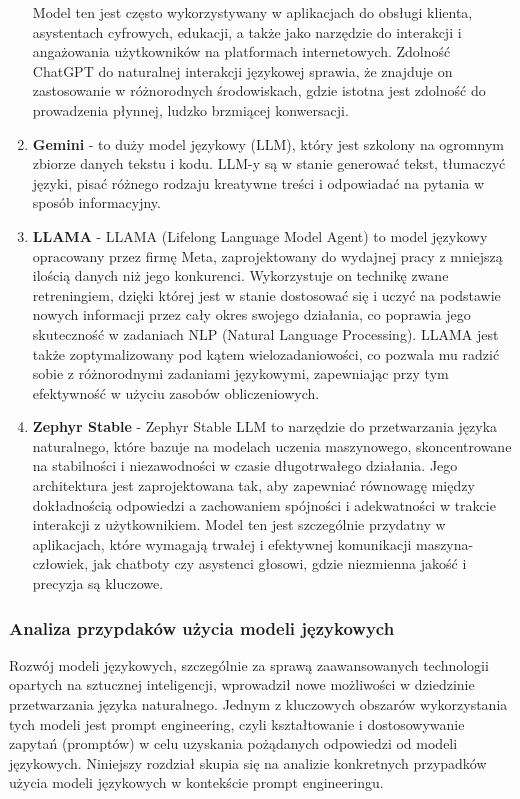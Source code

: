 \begin{enumerate}
    Model ten jest często wykorzystywany w aplikacjach do obsługi klienta, asystentach cyfrowych, edukacji, a także jako narzędzie do interakcji i angażowania użytkowników na platformach internetowych. Zdolność ChatGPT do naturalnej interakcji językowej sprawia, że znajduje on zastosowanie w różnorodnych środowiskach, gdzie istotna jest zdolność do prowadzenia płynnej, ludzko brzmiącej konwersacji.
    \\
    \item {\bf Gemini} - to duży model językowy (LLM), który jest szkolony na ogromnym zbiorze danych tekstu i kodu. LLM-y są w stanie generować tekst, tłumaczyć języki, pisać różnego rodzaju kreatywne treści i odpowiadać na pytania w sposób informacyjny.
    \\
    \item {\bf LLAMA} - LLAMA (Lifelong Language Model Agent) to model językowy opracowany przez firmę Meta, zaprojektowany do wydajnej pracy z mniejszą ilością danych niż jego konkurenci. Wykorzystuje on technikę zwane retreningiem, dzięki której jest w stanie dostosować się i uczyć na podstawie nowych informacji przez cały okres swojego działania, co poprawia jego skuteczność w zadaniach NLP (Natural Language Processing). LLAMA jest także zoptymalizowany pod kątem wielozadaniowości, co pozwala mu radzić sobie z różnorodnymi zadaniami językowymi, zapewniając przy tym efektywność w użyciu zasobów obliczeniowych.
    \\
    \item {\bf Zephyr Stable} - Zephyr Stable LLM to narzędzie do przetwarzania języka naturalnego, które bazuje na modelach uczenia maszynowego, skoncentrowane na stabilności i niezawodności w czasie długotrwałego działania. Jego architektura jest zaprojektowana tak, aby zapewniać równowagę między dokładnością odpowiedzi a zachowaniem spójności i adekwatności w trakcie interakcji z użytkownikiem. Model ten jest szczególnie przydatny w aplikacjach, które wymagają trwałej i efektywnej komunikacji maszyna-człowiek, jak chatboty czy asystenci głosowi, gdzie niezmienna jakość i precyzja są kluczowe.
    \\

\end{enumerate}

\subsubsection{Analiza przypdaków użycia modeli językowych}

Rozwój modeli językowych, szczególnie za sprawą zaawansowanych technologii opartych na sztucznej inteligencji, wprowadził nowe możliwości w dziedzinie przetwarzania języka naturalnego. Jednym z kluczowych obszarów wykorzystania tych modeli jest prompt engineering, czyli kształtowanie i dostosowywanie zapytań (promptów) w celu uzyskania pożądanych odpowiedzi od modeli językowych. Niniejszy rozdział skupia się na analizie konkretnych przypadków użycia modeli językowych w kontekście prompt engineeringu.

